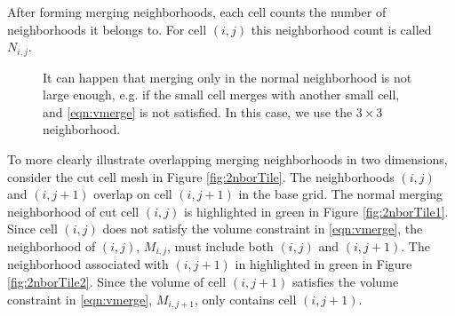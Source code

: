 After forming merging neighborhoods, each cell counts the number of neighborhoods it belongs to.
For cell $(i,j)$ this neighborhood count is called $N_{i,j}$.

\begin{figure}[h]
\hspace*{.5in}
	\hfill
	\caption{\sf It can happen that merging only in the normal neighborhood is not 
        large enough, e.g. if the small cell merges with another small cell, and \eqref{eqn:vmerge} is not satisfied.  In this case, we use the $3\times 3$ neighborhood. }
\end{figure}


To more clearly illustrate overlapping merging neighborhoods in two dimensions, consider the cut cell 
mesh in Figure \ref{fig:2nborTile}.   The neighborhoods $(i,j)$ and $(i,j+1)$ overlap on cell $(i,j+1)$ in 
the base grid.  The normal merging neighborhood of cut cell $(i,j)$ is highlighted in green in Figure \ref{fig:2nborTile1}.  
Since cell $(i,j)$ does not satisfy the volume constraint in \eqref{eqn:vmerge},
the neighborhood of $(i,j)$, $M_{i,j}$, must include both $(i,j)$ and $(i,j+1)$.  
The neighborhood associated with $(i,j+1)$ in highlighted in green in Figure \ref{fig:2nborTile2}.  
Since the volume of cell $(i,j+1)$ satisfies the volume constraint in \eqref{eqn:vmerge}, $M_{i,j+1}$, only contains cell $(i,j+1)$.
  
